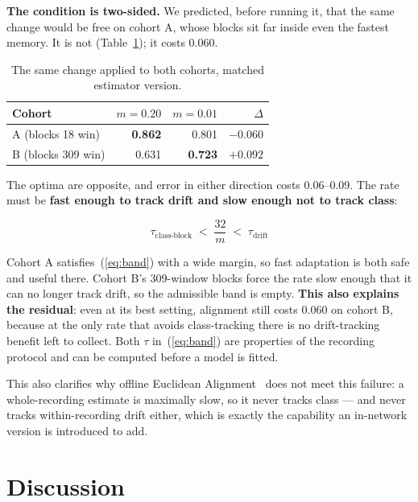 \documentclass[preprint,12pt]{elsarticle}
\begin{document}
\textbf{The condition is two-sided.} We predicted, before running it, that the
same change would be free on cohort A, whose blocks sit far inside even the
fastest memory. It is not
(Table~\ref{tab:twosided}); it costs 0.060.

\begin{table}[htbp]
\caption{The same change applied to both cohorts, matched estimator version.}
\label{tab:twosided}
\centering
\begin{tabular}{lrrr}
\toprule
Cohort & $m=0.20$ & $m=0.01$ & $\Delta$ \\
\midrule
A (blocks 18 win)  & \textbf{0.862} & 0.801 & $\mathbf{-0.060}$ \\
B (blocks 309 win) & 0.631 & \textbf{0.723} & $\mathbf{+0.092}$ \\
\bottomrule
\end{tabular}
\end{table}

The optima are opposite, and error in either direction costs 0.06--0.09. The
rate must be \textbf{fast enough to track drift and slow enough not to track
class}:

\begin{equation}
\tau_{\mathrm{class\text{-}block}} \;<\; \frac{32}{m} \;<\; \tau_{\mathrm{drift}}
\label{eq:band}
\end{equation}

Cohort A satisfies~(\ref{eq:band}) with a wide margin, so fast adaptation is both
safe and useful there. Cohort B's 309-window blocks force the rate slow enough
that it can no longer track drift, so the admissible band is empty. \textbf{This
also explains the residual}: even at its best setting, alignment still costs
0.060 on cohort B, because at the only rate that avoids class-tracking there is
no drift-tracking benefit left to collect. Both $\tau$ in~(\ref{eq:band}) are
properties of the recording protocol and can be computed before a model is
fitted.

This also clarifies why offline Euclidean Alignment~\cite{hewu} does not meet
this failure: a whole-recording estimate is maximally slow, so it never tracks
class --- and never tracks within-recording drift either, which is exactly the
capability an in-network version is introduced to add.

\section{Discussion}
\end{document}
